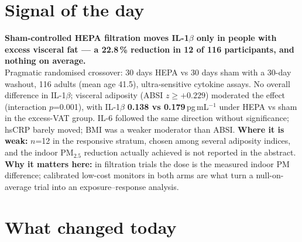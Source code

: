 \documentclass[10pt]{article}
\begin{document}
\vspace{6mm}

\section*{\sffamily\bfseries\color{Deep}Signal of the day}
\vspace{-1.5mm}{\color{Amber}\rule{\linewidth}{1.1pt}}\vspace{2.5mm}

\begin{keybox}
{\sffamily\bfseries\small\color{Deep}Sham-controlled HEPA filtration moves IL-1$\beta$ only in people with excess
visceral fat --- a 22.8\,\% reduction in 12 of 116 participants, and nothing on average.}\\[1.4mm]
\footnotesize
Pragmatic randomised crossover: 30 days HEPA vs 30 days sham with a 30-day washout, 116 adults (mean age 41.5),
ultra-sensitive cytokine assays. No overall difference in IL-1$\beta$; visceral adiposity (ABSI $z \geq +0.229$)
moderated the effect (interaction $p$=0.001), with IL-1$\beta$ \textbf{0.138 vs 0.179}\,pg\,mL$^{-1}$ under HEPA vs sham
in the excess-VAT group. IL-6 followed the same direction without significance; hsCRP barely moved; BMI was a weaker
moderator than ABSI.
\textbf{Where it is weak:} $n$=12 in the responsive stratum, chosen among several adiposity indices, and the indoor
PM$_{2.5}$ reduction actually achieved is not reported in the abstract.
\textbf{Why it matters here:} in filtration trials the dose is the measured indoor PM difference; calibrated
low-cost monitors in both arms are what turn a null-on-average trial into an exposure--response analysis.\par
\end{keybox}

\vspace{3mm}

\section*{\sffamily\bfseries\color{Deep}What changed today}
\vspace{-1.5mm}{\color{Amber}\rule{\linewidth}{1.1pt}}\vspace{2.5mm}
\end{document}
